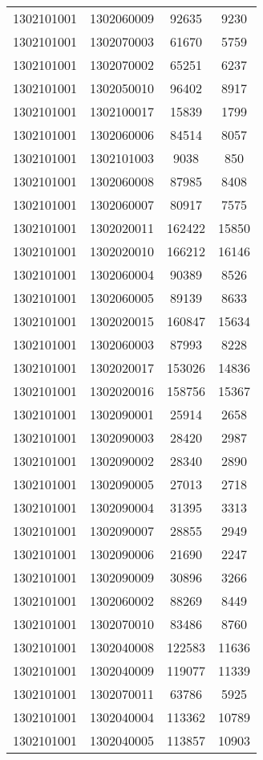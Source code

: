 \begin{longtable}[h]{llcc}
		1302101001 & 1302060009 & 92635 & 9230\\
		1302101001 & 1302070003 & 61670 & 5759\\
		1302101001 & 1302070002 & 65251 & 6237\\
		1302101001 & 1302050010 & 96402 & 8917\\
		1302101001 & 1302100017 & 15839 & 1799\\
		1302101001 & 1302060006 & 84514 & 8057\\
		1302101001 & 1302101003 & 9038 & 850\\
		1302101001 & 1302060008 & 87985 & 8408\\
		1302101001 & 1302060007 & 80917 & 7575\\
		1302101001 & 1302020011 & 162422 & 15850\\
		1302101001 & 1302020010 & 166212 & 16146\\
		1302101001 & 1302060004 & 90389 & 8526\\
		1302101001 & 1302060005 & 89139 & 8633\\
		1302101001 & 1302020015 & 160847 & 15634\\
		1302101001 & 1302060003 & 87993 & 8228\\
		1302101001 & 1302020017 & 153026 & 14836\\
		1302101001 & 1302020016 & 158756 & 15367\\
		1302101001 & 1302090001 & 25914 & 2658\\
		1302101001 & 1302090003 & 28420 & 2987\\
		1302101001 & 1302090002 & 28340 & 2890\\
		1302101001 & 1302090005 & 27013 & 2718\\
		1302101001 & 1302090004 & 31395 & 3313\\
		1302101001 & 1302090007 & 28855 & 2949\\
		1302101001 & 1302090006 & 21690 & 2247\\
		1302101001 & 1302090009 & 30896 & 3266\\
		1302101001 & 1302060002 & 88269 & 8449\\
		1302101001 & 1302070010 & 83486 & 8760\\
		1302101001 & 1302040008 & 122583 & 11636\\
		1302101001 & 1302040009 & 119077 & 11339\\
		1302101001 & 1302070011 & 63786 & 5925\\
		1302101001 & 1302040004 & 113362 & 10789\\
		1302101001 & 1302040005 & 113857 & 10903\\

\end{longtable}
